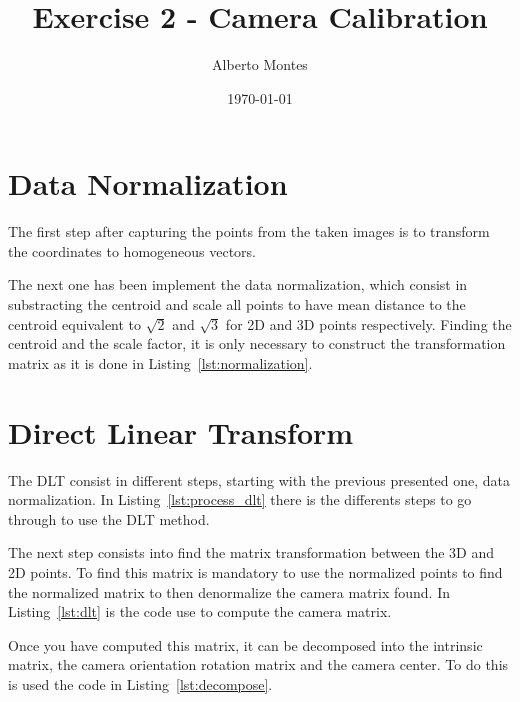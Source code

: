 \documentclass{ethz_report}
\title{Exercise 2 - Camera Calibration}
\author{Alberto Montes}
\date{\today}
\begin{document}
\maketitle

\section*{Data Normalization}

The first step after capturing the points from the taken images is to transform the coordinates to homogeneous vectors.



The next one has been implement the data normalization, which consist in substracting the centroid and scale all points to have mean distance to the centroid equivalent to $\sqrt{2}$ and $\sqrt{3}$ for 2D and 3D points respectively. Finding the centroid and the scale factor, it is only necessary to construct the transformation matrix as it is done in Listing~\ref{lst:normalization}.



\section*{Direct Linear Transform}

The DLT consist in different steps, starting with the previous presented one, data normalization.
In Listing~\ref{lst:process_dlt} there is the differents steps to go through to use the DLT method.



The next step consists into find the matrix transformation between the 3D and 2D points. To find this matrix is mandatory to use the normalized points to find the normalized matrix to then denormalize the camera matrix found. In Listing~\ref{lst:dlt} is the code use to compute the camera matrix.



Once you have computed this matrix, it can be decomposed into the intrinsic matrix, the camera orientation rotation matrix and the camera center. To do this is used the code in Listing~\ref{lst:decompose}.
\end{document}
